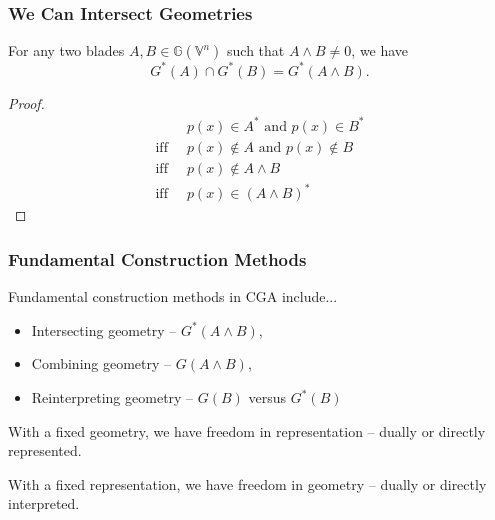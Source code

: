 \documentclass{beamer}
\newcommand{\G}{\mathbb{G}}
\newcommand{\V}{\mathbb{V}}
\begin{document}
\begin{frame}
\frametitle{We Can Intersect Geometries}
\pause
For any two blades $A,B\in\G(\V^n)$ such that $A\wedge B\neq 0$,
we have
\begin{equation*}
G^*(A)\cap G^*(B)=G^*(A\wedge B).
\end{equation*}\pause
\begin{proof}
\begin{align*}
 & \mbox{$p(x)\in A^*$ and $p(x)\in B^*$} \\
\mbox{iff}\;\; & \mbox{$p(x)\not\in A$ and $p(x)\not\in B$} \\
\mbox{iff}\;\; & \mbox{$p(x)\not\in A\wedge B$} \\
\mbox{iff}\;\; & \mbox{$p(x)\in(A\wedge B)^*$}
\end{align*}
\end{proof}
\end{frame}

\begin{frame}
\frametitle{Fundamental Construction Methods}
\pause
Fundamental construction methods in CGA include...\pause
\begin{itemize}
\item \alert{Intersecting} geometry -- $G^*(A\wedge B)$,\pause
\item \alert{Combining} geometry -- $G(A\wedge B)$,\pause
\item \alert{Reinterpreting} geometry -- $G(B)$ versus $G^*(B)$\pause
\end{itemize}
With a \alert{fixed} geometry, we have \alert{freedom} in representation -- dually or directly represented.\pause

With a \alert{fixed} representation, we have \alert{freedom} in geometry -- dually or directly interpreted.
\end{frame}

%
%
%
%
\end{document}
